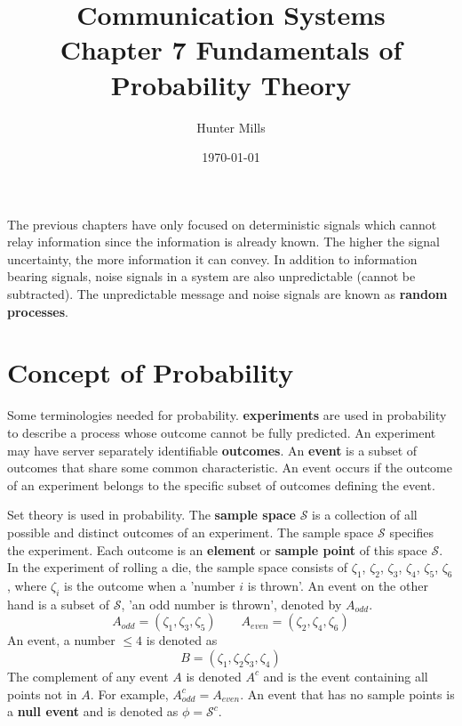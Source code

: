\documentclass{article}
\title{Communication Systems \\
    \large Chapter 7 Fundamentals of Probability Theory }
\author{Hunter Mills}
\date{\today}
\begin{document}
    \maketitle

    \medskip
        
    The previous chapters have only focused on deterministic signals which cannot relay information since
    the information is already known. The higher the signal uncertainty, the more information it can convey. 
    In addition to information bearing signals, noise signals in a system are also unpredictable (cannot be 
    subtracted). The unpredictable message and noise signals are known as \textbf{random processes}.

    \section{Concept of Probability}
    Some terminologies needed for probability. \textbf{experiments} are used in probability to describe a process
    whose outcome cannot be fully predicted. An experiment may have server separately identifiable \textbf{
    outcomes}. An \textbf{event} is a subset of outcomes that share some common characteristic. An event 
    occurs if the outcome of an experiment belongs to the specific subset of outcomes defining the event.

    Set theory is used in probability. The \textbf{sample space} $\mathcal{S}$ is a collection of all
    possible and distinct outcomes of an experiment. The sample space $\mathcal{S}$ specifies the 
    experiment. Each outcome is an \textbf{element} or \textbf{sample point} of this space $\mathcal{S}$.
    In the experiment of rolling a die, the sample space consists of $\zeta_1$, $\zeta_2$, $\zeta_3$, 
    $\zeta_4$, $\zeta_5$, $\zeta_6$, where $\zeta_i$ is the outcome when a 'number $i$ is thrown'. An
    event on the other hand is a subset of $\mathcal{S}$, 'an odd number is thrown', denoted by $A_{odd}$.
    \begin{equation}
        A_{odd} = (\zeta_1, \zeta_3, \zeta_5) \quad\quad A_{even} = (\zeta_2, \zeta_4, \zeta_6)
    \end{equation}
    An event, a number $\le 4$ is denoted as
    \begin{equation}
        B =  (\zeta_1, \zeta_2 \zeta_3, \zeta_4)
    \end{equation}
    The complement of any event $A$ is denoted $A^c$ and is the event containing all points not in $A$. 
    For example, $A_{odd}^c = A_{even}$. An event that has no sample points is a \textbf{null event} and is
    denoted as $\phi = \mathcal{S}^c$.
\end{document}
